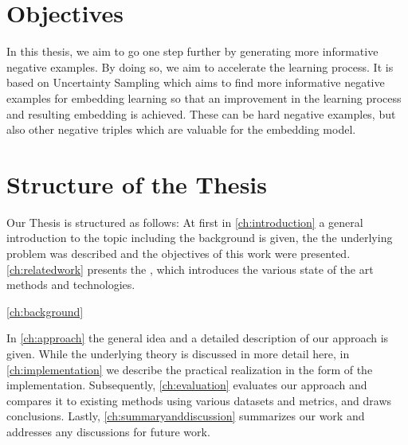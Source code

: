 \section{Objectives}

In this thesis, we aim to go one step further by generating more informative negative examples. 
By doing so, we aim to accelerate the learning process.
It is based on Uncertainty Sampling which aims to find more informative negative examples for embedding learning so that an improvement in the learning process and resulting embedding is achieved.
These can be hard negative examples, but also other negative triples which are valuable for the embedding model.




\section{Structure of the Thesis}

Our Thesis is structured as follows:
At first in \autoref{ch:introduction} a general introduction to the topic including the background is given, the 
the underlying problem was described and the objectives of this work were presented.
\autoref{ch:relatedwork} presents the , which introduces the various state of the art methods and technologies. 

\autoref{ch:background}

In \autoref{ch:approach} the general idea and a detailed description of our approach is given.
While the underlying theory is discussed in more detail here, in \autoref{ch:implementation} we describe the practical realization in the form of the implementation.
Subsequently, \autoref{ch:evaluation} evaluates our approach and compares it to existing methods using various datasets and metrics, and draws conclusions.
Lastly, \autoref{ch:summaryanddiscussion} summarizes our work and addresses any discussions for future work.




